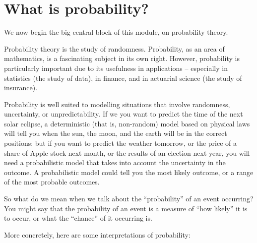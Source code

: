 \documentclass[
  a4paper,
]{book}
\theoremstyle{definition}
\theoremstyle{definition}
\theoremstyle{definition}
\theoremstyle{definition}
\theoremstyle{remark}
\begin{document}
\renewcommand{\complement}{\mathsf{c}}
\newcommand{\comp}{\complement}

\hypertarget{what-is-prob}{%
\section{What is probability?}\label{what-is-prob}}

We now begin the big central block of this module, on probability theory.

Probability theory is the study of randomness. Probability, as an area of mathematics, is a fascinating subject in its own right. However, probability is particularly important due to its usefulness in applications -- especially in statistics (the study of data), in finance, and in actuarial science (the study of insurance).

Probability is well suited to modelling situations that involve randomness, uncertainty, or unpredictability. If we you want to predict the time of the next solar eclipse, a deterministic (that is, non-random) model based on physical laws will tell you when the sun, the moon, and the earth will be in the correct positions; but if you want to predict the weather tomorrow, or the price of a share of Apple stock next month, or the results of an election next year, you will need a probabilistic model that takes into account the uncertainty in the outcome. A probabilistic model could tell you the most likely outcome, or a range of the most probable outcomes.

So what do we mean when we talk about the ``probability'' of an event occurring? You might say that the probability of an event is a measure of ``how likely'' it is to occur, or what the ``chance'' of it occurring is.

More concretely, here are some interpretations of probability:
\end{document}
